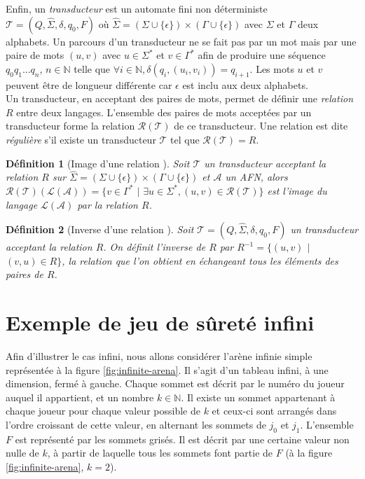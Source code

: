 \documentclass[12pt,a4paper,oneside,titlepage]{report}
\newtheorem{defi}{D\'efinition}[section]
\begin{document}
\noindent Enfin, un \emph{transducteur} est un automate fini non déterministe $\mathcal{T}=(Q,\hat{\Sigma},\delta,q_0,F)$ où $\hat{\Sigma}=(\Sigma\cup\{\epsilon\})\times(\Gamma\cup\{\epsilon\})$ avec $\Sigma$ et $\Gamma$ deux alphabets. Un parcours d'un transducteur ne se fait pas par un mot mais par une paire de mots $(u,v)$ avec $u\in\Sigma^*$ et $v\in\Gamma^*$ afin de produire une séquence $q_0q_1...q_n$, $n\in\mathbb{N}$ telle que $\forall i\in\mathbb{N}, \delta(q_i,(u_i,v_i))=q_{i+1}$. Les mots $u$ et $v$ peuvent être de longueur différente car $\epsilon$ est inclu aux deux alphabets.\\
Un transducteur, en acceptant des paires de mots, permet de définir une \emph{relation} $R$ entre deux langages. L'ensemble des paires de mots acceptées par un transducteur forme la relation $\mathcal{R}(\mathcal{T})$ de ce transducteur. Une relation est dite \emph{régulière} s'il existe un transducteur $\mathcal{T}$ tel que $\mathcal{R}(\mathcal{T})=R$.
\begin{defi}[Image d'une relation \cite{NeiderThesis}]
Soit $\mathcal{T}$ un transducteur acceptant la relation $R$ sur $\hat{\Sigma}=(\Sigma\cup\{\epsilon\})\times(\Gamma\cup\{\epsilon\})$ et $\mathcal{A}$ un AFN, alors\\ $\mathcal{R}(\mathcal{T})(\mathcal{L}(\mathcal{A}))=\{v\in\Gamma^*$ $|$ $\exists u\in\Sigma^*, (u,v)\in\mathcal{R}(\mathcal{T})\}$ est l'image du langage $\mathcal{L}(\mathcal{A})$ par la relation $R$.
\end{defi}
\begin{defi}[Inverse d'une relation \cite{NeiderThesis}]
Soit $\mathcal{T}=(Q,\hat{\Sigma},\delta,q_0,F)$ un transducteur acceptant la relation $R$. On définit l'inverse de $R$ par $R^{-1}=\{(u,v)$ $|$ $(v,u)\in R\}$, la relation que l'on obtient en échangeant tous les éléments des paires de $R$.
\end{defi}

\section{Exemple de jeu de sûreté infini}
\label{secexemple}
Afin d'illustrer le cas infini, nous allons considérer l'arène infinie simple représentée à la figure \ref{fig:infinite-arena}. Il s'agit d'un tableau infini, à une dimension, fermé à gauche. Chaque sommet est décrit par le numéro du joueur auquel il appartient, et un nombre $k\in\mathbb{N}$. Il existe un sommet appartenant à chaque joueur pour chaque valeur possible de $k$ et ceux-ci sont arrangés dans l'ordre croissant de cette valeur, en alternant les sommets de $j_0$ et $j_1$. L'ensemble $F$ est représenté par les sommets grisés. Il est décrit par une certaine valeur non nulle de $k$, à partir de laquelle tous les sommets font partie de $F$ (à la figure \ref{fig:infinite-arena}, $k=2$).
\end{document}
